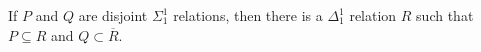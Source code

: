 If $P$ and $Q$ are disjoint $\Sigma_1^1$ relations, then there is a $\Delta_1^1$ relation $R$ such that $P \subseteq R$ and $Q \subset \overline{R}$.
